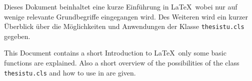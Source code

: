 \documentclass[../thesis.tex]{subfiles} %
\begin{document}
\begin{kurzfassung*}
Dieses Dokument beinhaltet eine kurze Einführung in \LaTeX\, wobei nur auf wenige relevante Grundbegriffe eingegangen wird. Des Weiteren wird ein kurzer Überblick über die Möglichkeiten und Anwendungen der Klasse \verb|thesistu.cls| gegeben.
\end{kurzfassung*}

\begin{abstract*}
This Document contains a short Introduction to \LaTeX\, only some basic functions are explained. Also a short overview of the possibilities of the class \verb|thesistu.cls| and how to use in are given.
\end{abstract*}
\end{document}

